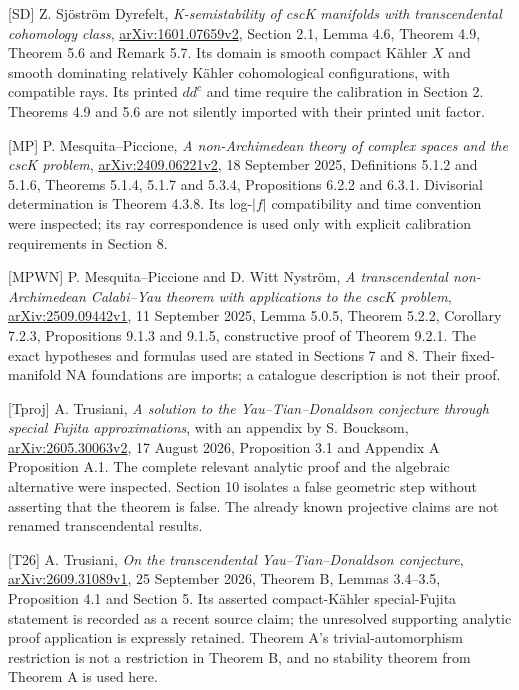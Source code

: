 \documentclass[
  11pt,
]{article}
\begin{document}
{[}SD{]} Z. Sjöström Dyrefelt, \emph{K-semistability of cscK manifolds
with transcendental cohomology class},
\href{https://arxiv.org/pdf/1601.07659v2}{arXiv:1601.07659v2}, Section
2.1, Lemma 4.6, Theorem 4.9, Theorem 5.6 and Remark 5.7. Its domain is
smooth compact Kähler \(X\) and smooth dominating relatively Kähler
cohomological configurations, with compatible rays. Its printed \(dd^c\)
and time require the calibration in Section 2. Theorems 4.9 and 5.6 are
not silently imported with their printed unit factor.

{[}MP{]} P. Mesquita--Piccione, \emph{A non-Archimedean theory of
complex spaces and the cscK problem},
\href{https://arxiv.org/pdf/2409.06221v2}{arXiv:2409.06221v2}, 18
September 2025, Definitions 5.1.2 and 5.1.6, Theorems 5.1.4, 5.1.7 and
5.3.4, Propositions 6.2.2 and 6.3.1. Divisorial determination is Theorem
4.3.8. Its log-\(|f|\) compatibility and time convention were inspected;
its ray correspondence is used only with explicit calibration
requirements in Section 8.

{[}MPWN{]} P. Mesquita--Piccione and D. Witt Nyström, \emph{A
transcendental non-Archimedean Calabi--Yau theorem with applications to
the cscK problem},
\href{https://arxiv.org/pdf/2509.09442v1}{arXiv:2509.09442v1}, 11
September 2025, Lemma 5.0.5, Theorem 5.2.2, Corollary 7.2.3,
Propositions 9.1.3 and 9.1.5, constructive proof of Theorem 9.2.1. The
exact hypotheses and formulas used are stated in Sections 7 and 8. Their
fixed-manifold NA foundations are imports; a catalogue description is
not their proof.

{[}Tproj{]} A. Trusiani, \emph{A solution to the Yau--Tian--Donaldson
conjecture through special Fujita approximations}, with an appendix by
S. Boucksom,
\href{https://arxiv.org/pdf/2605.30063v2}{arXiv:2605.30063v2}, 17 August
2026, Proposition 3.1 and Appendix A Proposition A.1. The complete
relevant analytic proof and the algebraic alternative were inspected.
Section 10 isolates a false geometric step without asserting that the
theorem is false. The already known projective claims are not renamed
transcendental results.

{[}T26{]} A. Trusiani, \emph{On the transcendental Yau--Tian--Donaldson
conjecture},
\href{https://arxiv.org/pdf/2609.31089v1}{arXiv:2609.31089v1}, 25
September 2026, Theorem B, Lemmas 3.4--3.5, Proposition 4.1 and Section
5. Its asserted compact-Kähler special-Fujita statement is recorded as a
recent source claim; the unresolved supporting analytic proof
application is expressly retained. Theorem A's trivial-automorphism
restriction is not a restriction in Theorem B, and no stability theorem
from Theorem A is used here.
\end{document}
